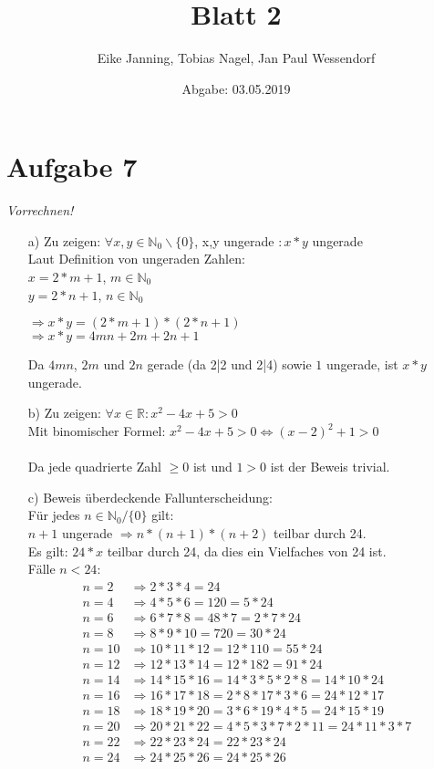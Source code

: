 \documentclass[paper = a4, ngerman]{scrartcl}
\title{Blatt 2}
\author{Eike Janning, Tobias Nagel, Jan Paul Wessendorf}
\date{Abgabe: 03.05.2019}
\begin{document}
	\maketitle
	\hrulefill
	
	\section*{Aufgabe 7}
	\textit{Vorrechnen!}
		\begin{itemize}
			\item[a)] Zu zeigen: $\forall x,y \in \mathbb{N}_0 \backslash \{ 0 \}$, x,y ungerade $: x*y$ ungerade\\
			Laut Definition von ungeraden Zahlen:\\
			$x = 2*m+1$, $m\in \mathbb{N}_0$\\
			$y = 2*n+1$, $n\in \mathbb{N}_0$
			\begin{center}
				$\Rightarrow x*y = (2*m+1)*(2*n+1)$\\
				$\Rightarrow x*y = 4mn + 2m + 2n + 1$
			\end{center}
			Da $4mn$, $2m$ und $2n$ gerade (da 2|2 und 2|4) sowie $1$ ungerade, ist $x*y$ ungerade.
			
			\item[b)] Zu zeigen: $\forall x \in \mathbb{R} : x^2 - 4x + 5 > 0$\\
			Mit binomischer Formel: $x^2 - 4x + 5 > 0 \Leftrightarrow (x - 2)^2 + 1 > 0$\\\\
			Da jede quadrierte Zahl $\ge 0$ ist und $1 > 0$ ist der Beweis trivial.
\pagebreak
			
			\item[c)]
			Beweis überdeckende Fallunterscheidung:\\
			Für jedes $n \in \mathbb{N}_0 / \{ 0 \}$ gilt:\\
			$n+1$ ungerade $\Rightarrow n*(n+1)*(n+2)$ teilbar durch 24.\\
			Es gilt: $24*x$ teilbar durch 24, da dies ein Vielfaches von 24 ist.\\
			Fälle $n<24$:
			\begin{align*}
				n=2 &\Rightarrow 2*3*4 = 24\\
				n=4 &\Rightarrow 4*5*6 = 120 = 5*24\\
				n=6 &\Rightarrow 6*7*8 = 48*7 = 2*7*24\\
				n=8 &\Rightarrow 8*9*10 = 720 = 30*24\\
				n=10 &\Rightarrow 10*11*12 = 12*110 = 55*24\\
				n=12 &\Rightarrow 12*13*14 = 12*182 = 91*24\\
				n=14 &\Rightarrow 14*15*16 = 14*3*5*2*8 = 14*10*24\\
				n=16 &\Rightarrow 16*17*18 = 2*8*17*3*6 = 24*12*17\\
				n=18 &\Rightarrow 18*19*20 = 3*6*19*4*5 = 24*15*19\\
				n=20 &\Rightarrow 20*21*22 = 4*5*3*7*2*11 = 24*11*3*7\\
				n=22 &\Rightarrow 22*23*24 = 22*23*24\\
				n=24 &\Rightarrow 24*25*26 = 24*25*26\\
			\end{align*}
			

\end{itemize}
\end{document}
